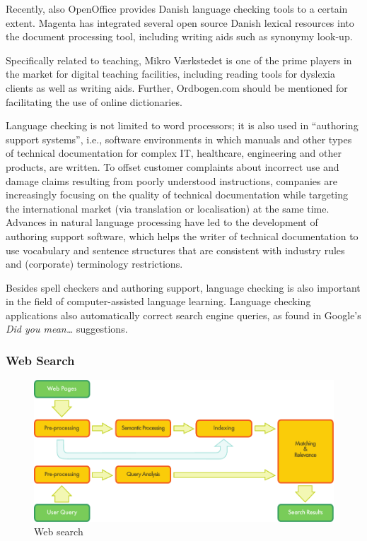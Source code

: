 \begin{multicols}{2}
Recently, also OpenOffice provides Danish language checking tools to a certain extent. Magenta  has integrated several open source Danish lexical resources into the document processing tool, including writing aids such as synonymy look-up. 

Specifically related to teaching, Mikro V\ae rk\-stedet is one of the prime players in the market for digital teaching facilities, including reading tools for dyslexia clients as well as writing aids. Further, Ordbogen.com should be mentioned for facilitating the use of online dictionaries.  

Language checking is not limited to word processors; it is also used in “authoring support systems”, i.e., software environments in which manuals and other types of technical documentation for complex IT, healthcare, engineering and other products, are written. To offset customer complaints about incorrect use and damage claims resulting from poorly understood instructions, companies are increasingly focusing on the quality of technical documentation while targeting the international market (via translation or localisation) at the same time. Advances in natural language processing have led to the development of authoring support software, which helps the writer of technical documentation to use vocabulary and sentence structures that are consistent with industry rules and (corporate) terminology restrictions.


Besides spell checkers and authoring support, language checking is also important in the field of computer-assisted language learning. Language checking applications also automatically correct search engine queries, as found in Google's \textit{Did you mean…} suggestions.

\subsubsection{Web Search}

\begin{figure}[htb]
  \center
  \includegraphics[width=\textwidth]{../_media/english/web_search_architecture}
  \caption{Web search}
  \label{fig:websearcharch_en}
 \end{figure}


\end{multicols}
